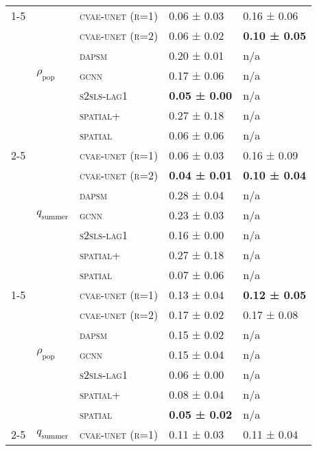 \documentclass{article}
\begin{document}
\begin{table}[!tbp]
\begin{tabular}{lllll}
\cline{1-5} \cline{2-5}
\multirow[t]{14}{*}{$ (SC)\; PM\_{2.5} \;\to\; m \;(r=1) $} & \multirow[t]{7}{*}{$\rho_{\text{pop}}$} & \textsc{cvae-unet (r=1)} & 0.06 ± {\small 0.03} & 0.16 ± {\small 0.06} \\
 &  & \textsc{cvae-unet (r=2)} & 0.06 ± {\small 0.02} & \bf 0.10 ± {\small 0.05} \\
 &  & \textsc{dapsm} & 0.20 ± {\small 0.01} & n/a \\
 &  & \textsc{gcnn} & 0.17 ± {\small 0.06} & n/a \\
 &  & \textsc{s2sls-lag1} & \bf 0.05 ± {\small 0.00} & n/a \\
 &  & \textsc{spatial+} & 0.27 ± {\small 0.18} & n/a \\
 &  & \textsc{spatial} & 0.06 ± {\small 0.06} & n/a \\
\cline{2-5}
 & \multirow[t]{7}{*}{$q_{\text{summer}}$} & \textsc{cvae-unet (r=1)} & 0.06 ± {\small 0.03} & 0.16 ± {\small 0.09} \\
 &  & \textsc{cvae-unet (r=2)} & \bf 0.04 ± {\small 0.01} & \bf 0.10 ± {\small 0.04} \\
 &  & \textsc{dapsm} & 0.28 ± {\small 0.04} & n/a \\
 &  & \textsc{gcnn} & 0.23 ± {\small 0.03} & n/a \\
 &  & \textsc{s2sls-lag1} & 0.16 ± {\small 0.00} & n/a \\
 &  & \textsc{spatial+} & 0.27 ± {\small 0.18} & n/a \\
 &  & \textsc{spatial} & 0.07 ± {\small 0.06} & n/a \\
\cline{1-5} \cline{2-5}
\multirow[t]{14}{*}{$ (SC)\; PM\_{2.5} \;\to\; m \;(r=2) $} & \multirow[t]{7}{*}{$\rho_{\text{pop}}$} & \textsc{cvae-unet (r=1)} & 0.13 ± {\small 0.04} & \bf 0.12 ± {\small 0.05} \\
 &  & \textsc{cvae-unet (r=2)} & 0.17 ± {\small 0.02} & 0.17 ± {\small 0.08} \\
 &  & \textsc{dapsm} & 0.15 ± {\small 0.02} & n/a \\
 &  & \textsc{gcnn} & 0.15 ± {\small 0.04} & n/a \\
 &  & \textsc{s2sls-lag1} & 0.06 ± {\small 0.00} & n/a \\
 &  & \textsc{spatial+} & 0.08 ± {\small 0.04} & n/a \\
 &  & \textsc{spatial} & \bf 0.05 ± {\small 0.02} & n/a \\
\cline{2-5}
 & \multirow[t]{7}{*}{$q_{\text{summer}}$} & \textsc{cvae-unet (r=1)} & 0.11 ± {\small 0.03} & 0.11 ± {\small 0.04} \\

\end{tabular}
\end{table}
\end{document}
